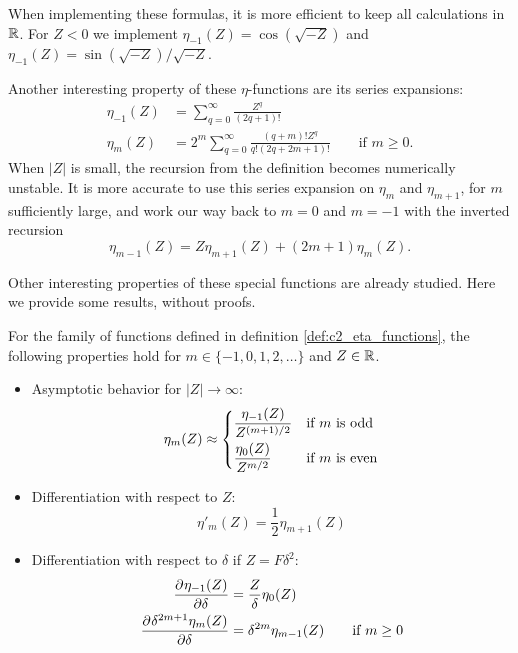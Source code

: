 When implementing these formulas, it is more efficient to keep all calculations in $\mathbb{R}$. For $Z < 0$ we implement $\eta_{-1}(Z) = \cos(\sqrt{-Z})$ and $\eta_{-1}(Z) = \sin(\sqrt{-Z})/\sqrt{-Z}$.

Another interesting property of these $\eta$-functions are its series expansions:\begin{align*}
    \eta_{-1}(Z) & = \sum_{q=0}^{\infty} \frac{Z^q}{(2q + 1)!}                                                      \\
    \eta_{m}(Z)  & = 2^m \sum_{q=0}^{\infty} \frac{(q+m)! Z^q}{q!(2q + 2m + 1)!} \qquad \text{if } m \geq 0\text{.}
\end{align*}
When $|Z|$ is small, the recursion from the definition becomes numerically unstable. It is more accurate to use this series expansion on $\eta_m$ and $\eta_{m+1}$, for $m$ sufficiently large, and work our way back to $m=0$ and $m=-1$ with the inverted recursion
$$
    \eta_{m-1}(Z) = Z \eta_{m+1}(Z) + (2 m + 1) \eta_{m}(Z)
    \text{.}
$$

Other interesting properties of these special functions are already studied. Here we provide some results, without proofs.
\begin{theorem}[Ixaru 1984]\label{the:c2_eta_functions}
    For the family of functions defined in definition \ref{def:c2_eta_functions}, the following properties hold for $m \in \{-1, 0, 1, 2, \dots\}$ and $Z \in \mathbb{R}$.
    \begin{itemize}
        \item Asymptotic behavior for $|Z| \to \infty$:
              $$\eta_m(Z) \approx  \begin{dcases}
                      \frac{\eta_{-1}(Z)}{Z^{(m+1)/2}} & \text{if $m$ is odd}  \\
                      \frac{\eta_{0}(Z)}{Z^{m/2}}      & \text{if $m$ is even}
                  \end{dcases}$$
        \item Differentiation with respect to $Z$:
              $$
                  \eta'_{m}(Z) = \frac{1}{2}\eta_{m+1}(Z)
              $$
        \item Differentiation with respect to $\delta$ if $Z = F\delta^2$:
              \begin{align*}
                  \pdv[]{\eta_{-1}(Z)}{\delta}             & = \frac{Z}{\delta} \eta_0(Z)                           \\
                  \pdv[]{\delta^{2m+1}\eta_{m}(Z)}{\delta} & = \delta^{2m} \eta_{m-1}(Z) \qquad \text{if } m \geq 0 \\
              \end{align*}
    \end{itemize}
\end{theorem}


